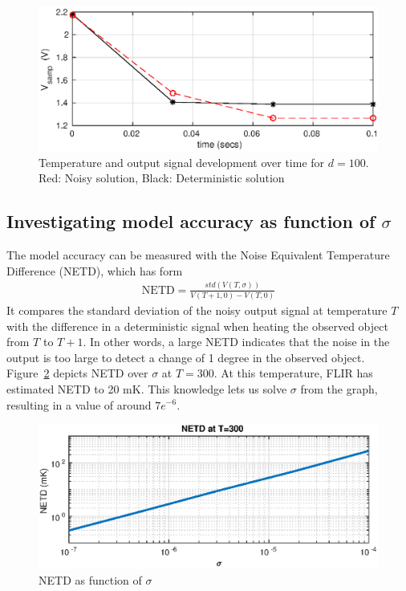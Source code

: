 \begin{figure}
\includegraphics[scale=0.9]{gfx/Vout_several_pulses_noise.eps}
\caption{Temperature and output signal development over time for
  $d=100$. Red: Noisy solution, Black: Deterministic solution}
\label{fig:noisysol}
\end{figure}


\subsection{Investigating model accuracy as function of $\sigma$}
The model accuracy can be measured with the Noise Equivalent Temperature Difference (NETD), which has form
\begin{align}
\mbox{NETD} = \frac{std(V(T, \sigma))}{V(T+1,0)-V(T,0)}
\end{align}
It compares the standard deviation of the noisy output signal at temperature $T$ with the difference in a deterministic signal when heating the observed object
from $T$ to $T+1$. In other words, a large NETD indicates that the noise in the output is too large to detect a change of 1 degree in the observed object.
Figure~\ref{fig:NETD_over_sigma} depicts NETD over $\sigma$ at $T=300$. At this temperature, FLIR has estimated NETD to 20 mK.
This knowledge lets us solve $\sigma$ from the graph, resulting in a value of around $7e^{-6}$.
\begin{figure}[H]
 \begin{center}
\includegraphics[scale=0.9]{gfx/NETD_as_function_of_sigma.eps}
  \caption{NETD as function of $\sigma$}
  \label{fig:NETD_over_sigma}
  \end{center}
\end{figure}

